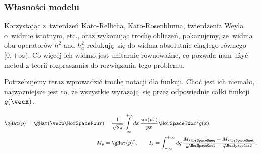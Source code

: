 \documentclass[10pt,t]{beamer}
\begin{document}
\begin{frame}
  \frametitle{Własności modelu}


  Korzystając z~twierdzeń Kato-Rellicha, Kato-Rosenbluma, twierdzenia
  Weyla o~widmie istotnym, etc., oraz wykonując trochę obliczeń, pokazujemy,
  że~widma obu operatorów $h^{ 2 }$ and $h_{ a }^{ 2 }$ redukują~się
  do widma absolutnie ciągłego równego $[ 0, +\infty )$. Co więcej ich widmo
  jest unitarnie równoważne, co pozwala nam użyć metod z teorii
  rozpraszania do rozwiązania tego problemu.

  Potrzebujemy teraz wprowadzić trochę notacji dla funkcji. Choć jest ich
  niemało, najważniejsze jest to, że wszystkie wyrażają~się przez
  odpowiednie całki funkcji $g( \vecx )$.

  \vspace{-1.6em}



  \begin{subequations}

    \begin{align}
      \label{eq:Pole-skalarne-ETC-02-A}
      \gHat( p ) = \gHat( \vecp \HorSpaceFour )
      &=
      \frac{ 1 }{ \sqrt{ 2 \pi } }
      \int\limits_{ -\infty }^{ +\infty } dx \, \frac{ \sin( p x ) }{ p x }
        \HorSpaceTwo x^{ 2 } g( x ), \\
      \label{eq:Pole-skalarne-ETC-02-B}
      M_{ p }
      &= \gHat( p )^{ 2 }, \qquad
        I_{ k } =
        \int_{ -\infty }^{ +\infty } dq \,
        \frac{ M_{ \HorSpaceOne q } - M_{ \HorSpaceOne k } }{
        k^{ \HorSpaceOne 2 } - q^{ \HorSpaceOne 2 } }.
    \end{align}

  \end{subequations}

\end{frame}
\end{document}
